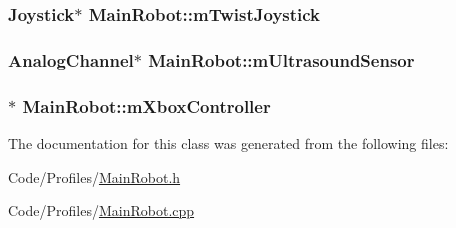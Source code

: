 \hypertarget{class_main_robot_a93c7b0ef0ea295e83c2b5dc7f006516f}{
\subsubsection[{m\-Twist\-Joystick}]{\setlength{\rightskip}{0pt plus 5cm}\-Joystick$\ast$ {\bf \-Main\-Robot\-::m\-Twist\-Joystick}}}\label{class_main_robot_a93c7b0ef0ea295e83c2b5dc7f006516f}
\hypertarget{class_main_robot_abf7ba8751a75e0b3d7157ac359ee45c0}{
\subsubsection[{m\-Ultrasound\-Sensor}]{\setlength{\rightskip}{0pt plus 5cm}\-Analog\-Channel$\ast$ {\bf \-Main\-Robot\-::m\-Ultrasound\-Sensor}}}\label{class_main_robot_abf7ba8751a75e0b3d7157ac359ee45c0}
\hypertarget{class_main_robot_a097d8b9d4c41f1ddf0ea95522969d46f}{
\subsubsection[{m\-Xbox\-Controller}]{$\ast$ {\bf \-Main\-Robot\-::m\-Xbox\-Controller}}}\label{class_main_robot_a097d8b9d4c41f1ddf0ea95522969d46f}


\-The documentation for this class was generated from the following files\-:\begin{DoxyCompactItemize}
\item 
\-Code/\-Profiles/\hyperlink{_main_robot_8h}{\-Main\-Robot.\-h}\item 
\-Code/\-Profiles/\hyperlink{_main_robot_8cpp}{\-Main\-Robot.\-cpp}\end{DoxyCompactItemize}
